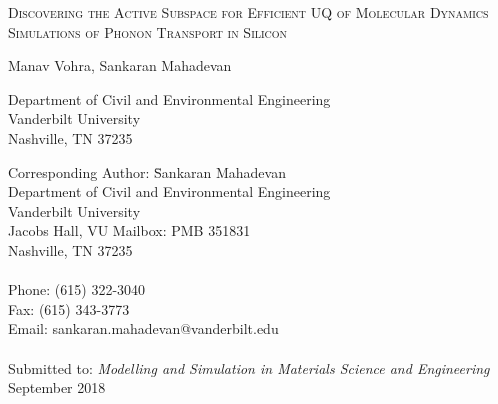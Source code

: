 \begin{center}
\textsc{
Discovering the Active Subspace for Efficient UQ of
Molecular Dynamics Simulations of Phonon Transport in Silicon
}

\bigskip 
\bigskip 

Manav Vohra, Sankaran Mahadevan

\bigskip
\bigskip

\normalsize
Department of Civil and Environmental Engineering\\
Vanderbilt University\\
Nashville, TN 37235\\

\end{center}

\vspace{6cm}

\begin{tabbing}
Corresponding Author: \hspace{5mm} \= Sankaran Mahadevan\\
       \>  Department of Civil and Environmental Engineering\\
       \>  Vanderbilt University\\
        Jacobs Hall, VU Mailbox: PMB 351831 \\
       \>  Nashville, TN 37235 \\
       \> \\
Phone: \> (615) 322-3040 \\
Fax:   \> (615) 343-3773 \\
Email: \>  sankaran.mahadevan@vanderbilt.edu   \\
\\
Submitted to: \> \textit{Modelling and Simulation in Materials Science and Engineering} \\
\>  September 2018\\

\bigskip
\end{tabbing}

\clearpage

